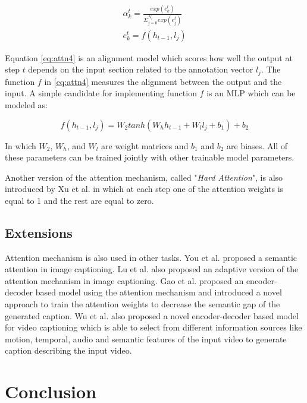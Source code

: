 \documentclass[preprint, 12pt]{elsarticle}
\begin{document}
		\begin{align}
			\alpha_k^t = \frac{exp(e_k^t)}{\Sigma_{j=0}^{N_i} exp(e_j^t)} \label{eq:attn3}\\
			e_k^t = f(h_{t-1}, l_j) \label{eq:attn4}
		\end{align}
		
		Equation \eqref{eq:attn4} is an alignment model which scores how well the output at step $t$ depends on the input section related to the annotation vector $l_j$. The function $f$ in \eqref{eq:attn4} measures the alignment between the output and the input. A simple candidate for implementing function $f$ is an MLP which can be modeled as:
		
		\begin{equation}
			f(h_{t-1}, l_j) = W_2 tanh(W_h h_{t-1} + W_l l_{j} + b_1) + b_2
		\end{equation}
		
		In which $W_2$, $W_h$, and $W_l$ are weight matrices and $b_1$ and $b_2$ are biases. All of these parameters can be trained jointly with other trainable model parameters.
		
		Another version of the attention mechanism, called "\textit{Hard Attention}", is also introduced by Xu et al. \cite{xu2015show} in which at each step one of the attention weights is equal to 1 and the rest are equal to zero. 
		
		\subsection{Extensions}
		Attention mechanism is also used in other tasks. You et al. \cite{you2016image} proposed a semantic attention in image captioning. Lu et al. \cite{lu2017knowing} also proposed an adaptive version of the attention mechanism in image captioning. Gao et al. proposed an encoder-decoder based model using the attention mechanism and introduced a novel approach to train the attention weights to decrease the semantic gap of the generated caption. Wu et al. \cite{wu2018hierarchical} also proposed a novel encoder-decoder based model for video captioning which is able to select from different information sources like motion, temporal, audio and semantic features of the input video to generate caption describing the input video.

		\section{Conclusion}
		
	
	
\end{document}
